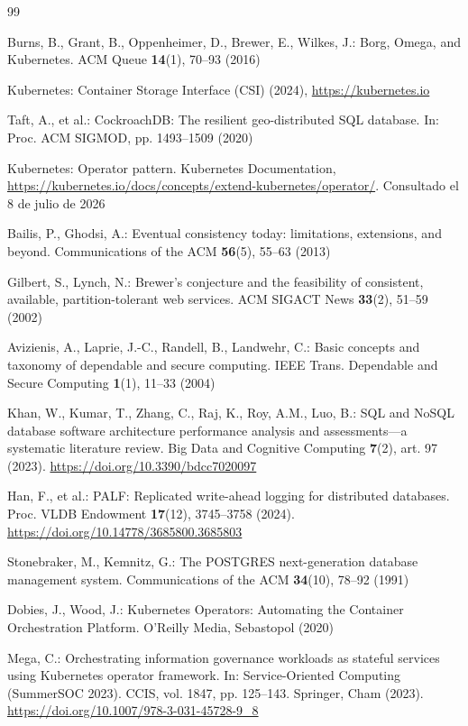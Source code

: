 \documentclass[a4paper]{llncs}
\providecommand{\doi}[1]{\url{https://doi.org/#1}}
\begin{document}
\begin{thebibliography}{99}
\setlength{\itemsep}{0pt}

Burns, B., Grant, B., Oppenheimer, D., Brewer, E., Wilkes, J.: Borg, Omega, and
Kubernetes. ACM Queue \textbf{14}(1), 70--93 (2016)

Kubernetes: Container Storage Interface (CSI) (2024),
\url{https://kubernetes.io}

Taft, A., et al.: CockroachDB: The resilient geo-distributed SQL database. In:
Proc. ACM SIGMOD, pp. 1493--1509 (2020)

Kubernetes: Operator pattern. Kubernetes Documentation,
\url{https://kubernetes.io/docs/concepts/extend-kubernetes/operator/}. Consultado
el 8 de julio de 2026

Bailis, P., Ghodsi, A.: Eventual consistency today: limitations, extensions, and
beyond. Communications of the ACM \textbf{56}(5), 55--63 (2013)

Gilbert, S., Lynch, N.: Brewer's conjecture and the feasibility of consistent,
available, partition-tolerant web services. ACM SIGACT News \textbf{33}(2),
51--59 (2002)

Avizienis, A., Laprie, J.-C., Randell, B., Landwehr, C.: Basic concepts and
taxonomy of dependable and secure computing. IEEE Trans. Dependable and Secure
Computing \textbf{1}(1), 11--33 (2004)

Khan, W., Kumar, T., Zhang, C., Raj, K., Roy, A.M., Luo, B.: SQL and NoSQL
database software architecture performance analysis and assessments---a
systematic literature review. Big Data and Cognitive Computing \textbf{7}(2),
art. 97 (2023). \doi{10.3390/bdcc7020097}

Han, F., et al.: PALF: Replicated write-ahead logging for distributed databases.
Proc. VLDB Endowment \textbf{17}(12), 3745--3758 (2024).
\doi{10.14778/3685800.3685803}

Stonebraker, M., Kemnitz, G.: The POSTGRES next-generation database management
system. Communications of the ACM \textbf{34}(10), 78--92 (1991)

Dobies, J., Wood, J.: Kubernetes Operators: Automating the Container
Orchestration Platform. O'Reilly Media, Sebastopol (2020)

Mega, C.: Orchestrating information governance workloads as stateful services
using Kubernetes operator framework. In: Service-Oriented Computing (SummerSOC
2023). CCIS, vol. 1847, pp. 125--143. Springer, Cham (2023).
\doi{10.1007/978-3-031-45728-9_8}


\end{thebibliography}
\end{document}
